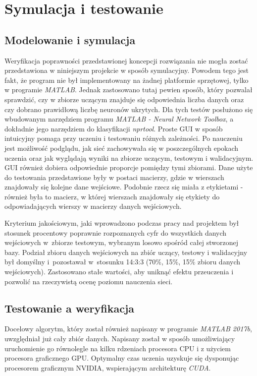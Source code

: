 \section{Symulacja i testowanie}
\label{sub:testowanie}

\subsection{Modelowanie i symulacja}
\label{sub:modelowanie}

Weryfikacja poprawności przedstawionej koncepcji rozwiązania nie mogła zostać przedstawiona w niniejszym projekcie w sposób symulacyjny. Powodem tego jest fakt, że program nie był implementowany na żadnej platformie sprzętowej, tylko w programie \textit{MATLAB}. Jednak zastosowano tutaj pewien sposób, który pozwalał sprawdzić, czy w zbiorze uczącym znajduje się odpowiednia liczba danych oraz czy dobrano prawidłową liczbę neuronów ukrytych. Dla tych testów posłużono się wbudowanym narzędziem programu \textit{MATLAB - Neural Network Toolbox}, a dokładnie jego narzędziem do klasyfikacji \textit{nprtool}. Proste GUI w sposób intuicyjny pomaga przy uczeniu i testowaniu różnych zależności. Po nauczeniu jest możliwość podglądu, jak sieć zachowywała się w poszczególnych epokach uczenia oraz jak wyglądają wyniki na zbiorze uczącym, testowym i walidacyjnym. GUI również dobiera odpowiednie proporcje pomiędzy tymi zbiorami. Dane użyte do testowania przedstawione były w postaci macierzy, gdzie w wierszach znajdowały się kolejne dane wejściowe. Podobnie rzecz się miała z etykietami - również była to macierz, w której wierszach znajdowały się etykiety do odpowiadających wierszy w macierzy danych wejściowych.


Kryterium jakościowym, jaki wprowadzono podczas pracy nad projektem był stosunek procentowy poprawnie rozpoznanych cyfr do wszystkich danych wejściowych w~zbiorze testowym, wybranym losowo spośród całej stworzonej bazy. Podział zbioru danych wejściowych na zbiór uczący, testowy i walidacyjny był domyślny i~pozostawał w~stosunku 14:3:3 (70\%, 15\%, 15\% zbioru danych wejściowych). Zastosowano stałe wartości, aby uniknąć efektu przeuczenia i pozwolić na rzeczywistą ocenę poziomu nauczenia sieci. 


\subsection{Testowanie a weryfikacja}
\label{sub:weryfikacja}

Docelowy algorytm, który został również napisany w programie \textit{MATLAB 2017b}, uwzględniał już cały zbiór danych. Napisany został w sposób umożliwiający uruchomienie go równolegle na kilku rdzeniach procesora CPU i z użyciem procesora graficznego GPU. Optymalny czas uczenia uzyskuje się dysponując procesorem graficznym NVIDIA, wspierającym architekturę \textit{CUDA}.


